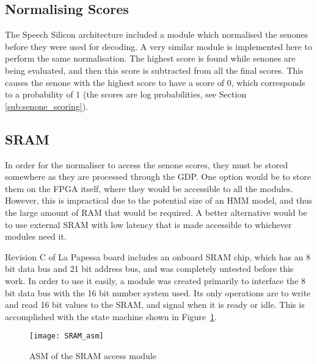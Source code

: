 	\subsection{Normalising Scores} %
	\label{sub:normaliser}
		The Speech Silicon architecture included a module which normalised the senones before they were used for decoding.  A very similar module is implemented here to perform the same normalisation.  The highest score is found while senones are being evaluated, and then this score is subtracted from all the final scores.  This causes the senone with the highest score to have a score of 0, which corresponds to a probability of 1 (the scores are log probabilities, see Section \ref{sub:senone_scoring}).

	\subsection{SRAM} %
	\label{sub:onboard_sram}
		In order for the normaliser to access the senone scores, they must be stored somewhere as they are processed through the GDP.  One option would be to store them on the FPGA itself, where they would be accessible to all the modules.  However, this is impractical due to the potential size of an HMM model, and thus the large amount of RAM that would be required.  A better alternative would be to use external SRAM with low latency that is made accessible to whichever modules need it.  

		Revision C of La Papessa board includes an onboard SRAM chip, which has an 8 bit data bus and 21 bit address bus, and was completely untested before this work.  In order to use it easily, a module was created primarily to interface the 8 bit data bus with the 16 bit number system used.  Its only operations are to write and read 16 bit values to the SRAM, and signal when it is ready or idle.  This is accomplished with the state machine shown in Figure~\ref{fig:sram_asm}.

		\begin{figure}[tb]
			\begin{center}
				\texttt{[image: SRAM\_asm]}
			\end{center}
			\caption{ASM of the SRAM access module}
			\label{fig:sram_asm}
		\end{figure}

